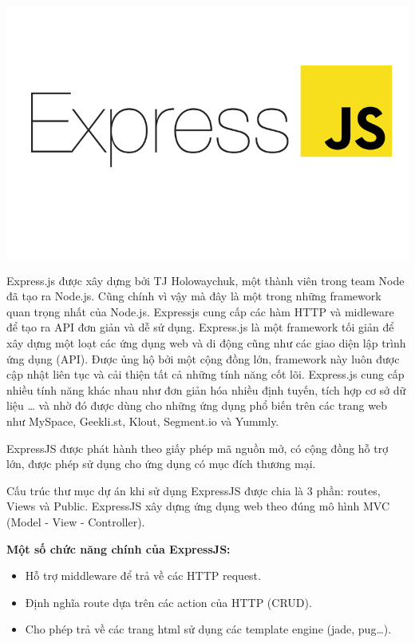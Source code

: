 \begin{center}
  \captionsetup{type=figure}
  \includegraphics[width=15cm]{img/expressjs.png}
\end{center}

Express.js được xây dựng bởi TJ Holowaychuk, một thành viên trong team Node đã tạo ra Node.js. Cũng chính vì vậy mà đây là một trong những framework quan trọng nhất của Node.js. Expressjs cung cấp các hàm HTTP và midleware để tạo ra API đơn giản và dễ sử dụng. Express.js là một framework tối giản để xây dựng một loạt các ứng dụng web và di động cũng như các giao diện lập trình ứng dụng (API). Được ủng hộ bởi một cộng đồng lớn, framework này luôn được cập nhật liên tục và cải thiện tất cả những tính năng cốt lõi. Express.js cung cấp nhiều tính năng khác nhau như đơn giản hóa nhiều định tuyến, tích hợp cơ sở dữ liệu … và nhờ đó được dùng cho những ứng dụng phổ biến trên các trang web như MySpace, Geekli.st, Klout, Segment.io và Yummly.

ExpressJS được phát hành theo giấy phép mã nguồn mở, có cộng đồng hỗ trợ lớn, được phép sử dụng cho ứng dụng có mục đích thương mại.

Cấu trúc thư mục dự án khi sử dụng ExpressJS được chia là 3 phần: routes, Views và Public. ExpressJS xây dựng ứng dụng web theo đúng mô hình MVC (Model - View - Controller).

\textbf{Một số chức năng chính của ExpressJS:}
\begin{itemize}
  \item Hỗ trợ middleware để trả về các HTTP request.
  \item Định nghĩa route dựa trên các action của HTTP (CRUD).
  \item Cho phép trả về các trang html sử dụng các template engine (jade, pug…).
\end{itemize}

